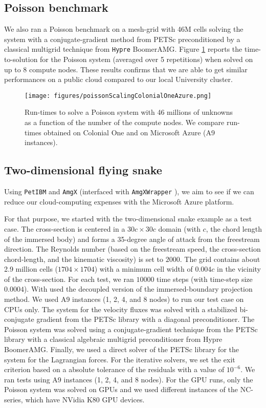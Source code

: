 \documentclass[10pt]{article}
\newcommand{\petibm}{\texttt{PetIBM} }
\newcommand{\amgx}{\texttt{AmgX} }
\newcommand{\amgxwrapper}{\texttt{AmgXWrapper} }
\newcommand{\hypre}{\texttt{Hypre} }
\begin{document}
\subsection{Poisson benchmark}

We also ran a Poisson benchmark on a mesh-grid with 46M cells solving the system with a conjugate-gradient method from PETSc preconditioned by a classical multigrid technique from \hypre BoomerAMG.
Figure \ref{poisson_colonialone_azure} reports the time-to-solution for the Poisson system (averaged over 5 repetitions) when solved on up to 8 compute nodes.
These results confirms that we are able to get similar performances on a public cloud compared to our local University cluster.

\begin{figure}[h!]
\centering
\texttt{[image: figures/poissonScalingColonialOneAzure.png]}
\caption{Run-times to solve a Poisson system with 46 millions of unknowns as a function of the number of the compute nodes. We compare run-times obtained on Colonial One and on Microsoft Azure (A9 instances).}
\label{poisson_colonialone_azure}
\end{figure}

\subsection{Two-dimensional flying snake}

Using \petibm and \amgx (interfaced with \amgxwrapper), we aim to see if we can reduce our cloud-computing expenses with the Microsoft Azure platform.

For that purpose, we started with the two-dimensional snake example as a test case.
The cross-section is centered in a $30c \times 30c$ domain (with $c$, the chord length of the immersed body) and forms a 35-degree angle of attack from the freestream direction.
The Reynolds number (based on the freestream speed, the cross-section chord-length, and the kinematic viscosity) is set to $2000$.
The grid contains about 2.9 million cells ($1704\times1704$) with a minimum cell width of $0.004c$ in the vicinity of the cross-section.
For each test, we ran $10000$ time steps (with time-step size $0.0004$).
With used the decoupled version of the immersed-boundary projection method\cite{Li_et_al_2016}.
We used A9 instances (1, 2, 4, and 8 nodes) to run our test case on CPUs only.
The system for the velocity fluxes was solved with a stabilized bi-conjugate gradient from the PETSc library with a diagonal preconditioner.
The Poisson system was solved using a conjugate-gradient technique from the PETSc library with a classical algebraic multigrid preconditioner from Hypre BoomerAMG.
Finally, we used a direct solver of the PETSc library for the system for the Lagrangian forces.
For the iterative solvers, we set the exit criterion based on a absolute tolerance of the residuals with a value of $10^{-6}$.
We ran tests using A9 instances (1, 2, 4, and 8 nodes).
For the GPU runs, only the Poisson system was solved on GPUs and we used different instances of the NC-series, which have NVidia K80 GPU devices.
\end{document}

